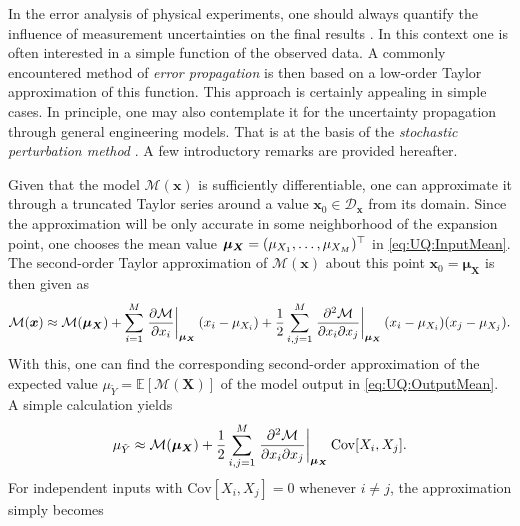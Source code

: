 In the error analysis of physical experiments, one should always quantify the influence of measurement uncertainties
on the final results \cite{Uncertainty:Fornasini2008,Uncertainty:Gupta2012,Uncertainty:Grabe2014}.
In this context one is often interested in a simple function of the observed data.
A commonly encountered method of \emph{error propagation} is then based on a low-order Taylor approximation of this function.
This approach is certainly appealing in simple cases.
In principle, one may also contemplate it for the uncertainty propagation through general engineering models.
That is at the basis of the \emph{stochastic perturbation method} \cite{Uncertainty:Kaminski2013}.
A few introductory remarks are provided hereafter.
\par %
Given that the model \(\mathcal{M}(\bm{x})\) is sufficiently differentiable,
one can approximate it through a truncated Taylor series around a value \(\bm{x}_0 \in \mathcal{D}_{\bm{x}}\) from its domain.
Since the approximation will be only accurate in some neighborhood of the expansion point,
one chooses the mean value \(\bm{\mu}_{\bm{X}} = (\mu_{X_1},\ldots,\mu_{X_M})^\top\) in \cref{eq:UQ:InputMean}.
The second-order Taylor approximation of \(\mathcal{M}(\bm{x})\) about this point \(\bm{x}_0 = \bm{\mu}_{\bm{X}}\) is then given as
\begin{equation} \label{eq:UQ:TaylorSeries}
  \mathcal{M}(\bm{x}) \approx \mathcal{M}(\bm{\mu}_{\bm{X}}) + \sum\limits_{i=1}^M \left. \frac{\partial \mathcal{M}}{\partial x_i} \right\rvert_{\bm{\mu}_{\bm{X}}} (x_i - \mu_{X_i})
  + \frac{1}{2} \sum\limits_{i,j=1}^M \left. \frac{\partial^2 \mathcal{M}}{\partial x_i \partial x_j} \right\rvert_{\bm{\mu}_{\bm{X}}} (x_i - \mu_{X_i}) (x_j - \mu_{X_j}).
\end{equation}
With this, one can find the corresponding second-order approximation of the expected value \(\mu_{\tilde{Y}} = \mathds{E}[\mathcal{M}(\bm{X})]\) of the model output in \cref{eq:UQ:OutputMean}.
A simple calculation yields
\begin{equation} \label{eq:UQ:TaylorMean}
  \mu_{\tilde{Y}} \approx \mathcal{M}(\bm{\mu}_{\bm{X}})
  + \frac{1}{2} \sum\limits_{i,j=1}^M \left. \frac{\partial^2 \mathcal{M}}{\partial x_i \partial x_j} \right\rvert_{\bm{\mu}_{\bm{X}}} \mathrm{Cov}[X_i,X_j].
\end{equation}
For independent inputs with \(\mathrm{Cov}[X_i,X_j] = 0\) whenever \(i \neq j\), the approximation simply becomes
